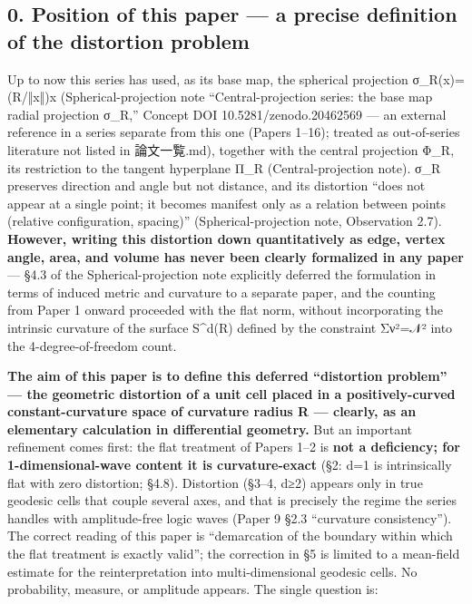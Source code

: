 \documentclass[
]{ltjsarticle}
\begin{document}
\subsection{0. Position of this paper --- a precise definition of the
distortion
problem}\label{position-of-this-paper-a-precise-definition-of-the-distortion-problem}

Up to now this series has used, as its base map, the spherical
projection σ\_R(x)=(R/‖x‖)x (Spherical-projection note
``Central-projection series: the base map radial projection σ\_R,''
Concept DOI 10.5281/zenodo.20462569 --- an external reference in a
series separate from this one (Papers 1--16); treated as out-of-series
literature not listed in 論文一覧.md), together with the central
projection Φ\_R, its restriction to the tangent hyperplane Π\_R
(Central-projection note). σ\_R preserves direction and angle but not
distance, and its distortion ``does not appear at a single point; it
becomes manifest only as a relation between points (relative
configuration, spacing)'' (Spherical-projection note, Observation 2.7).
\textbf{However, writing this distortion down quantitatively as edge,
vertex angle, area, and volume has never been clearly formalized in any
paper} --- §4.3 of the Spherical-projection note explicitly deferred the
formulation in terms of induced metric and curvature to a separate
paper, and the counting from Paper 1 onward proceeded with the flat
norm, without incorporating the intrinsic curvature of the surface
S\^{}d(R) defined by the constraint Σν²=𝒩² into the 4-degree-of-freedom
count.

\textbf{The aim of this paper is to define this deferred ``distortion
problem'' --- the geometric distortion of a unit cell placed in a
positively-curved constant-curvature space of curvature radius R ---
clearly, as an elementary calculation in differential geometry.} But an
important refinement comes first: the flat treatment of Papers 1--2 is
\textbf{not a deficiency; for 1-dimensional-wave content it is
curvature-exact} (§2: d=1 is intrinsically flat with zero distortion;
§4.8). Distortion (§3--4, d≥2) appears only in true geodesic cells that
couple several axes, and that is precisely the regime the series handles
with amplitude-free logic waves (Paper 9 §2.3 ``curvature
consistency''). The correct reading of this paper is ``demarcation of
the boundary within which the flat treatment is exactly valid''; the
correction in §5 is limited to a mean-field estimate for the
reinterpretation into multi-dimensional geodesic cells. No probability,
measure, or amplitude appears. The single question is:
\end{document}
